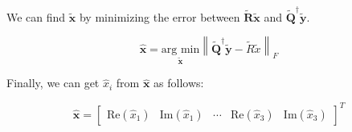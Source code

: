 \documentclass[fleqn]{article}
\newcommand{\norm}[1]{\left \lVert #1 \right \rVert}
\begin{document}
\begin{enumerate}
		We can find $\mathbf{\tilde{x}}$ by minimizing the error between $\mathbf{\tilde{R}\tilde{x}}$ and $\mathbf{\tilde{Q}^{\dagger}\tilde{y}}$.
		
		\begin{equation*}
			\mathbf{\hat{x}} = \underset{\mathbf{\tilde{x}}}{\text{arg min}}{\norm{\mathbf{\tilde{Q}^{\dagger}\tilde{y}} - \tilde{R}\tilde{x}}_F}
		\end{equation*}
		
		Finally, we can get $\hat{x}_i$ from $\mathbf{\hat{x}}$ as follows:
		
		\begin{equation*}
			\mathbf{\hat{x}} = \begin{bmatrix}\text{Re}(\hat{x}_1) & \text{Im}(\hat{x}_1) & \cdots & \text{Re}(\hat{x}_3) & \text{Im}(\hat{x}_3)\end{bmatrix}^T
		\end{equation*}
		
		
	\end{enumerate}
\end{document}
